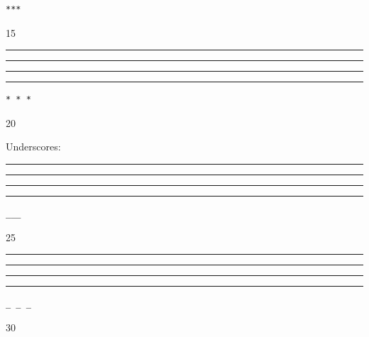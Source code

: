 \begin{verbatim}
***
\end{verbatim}

15

\begin{center}\rule{3in}{0.4pt}\end{center}

\begin{center}\rule{3in}{0.4pt}\end{center}

\begin{center}\rule{3in}{0.4pt}\end{center}

\begin{center}\rule{3in}{0.4pt}\end{center}

\begin{verbatim}
* * *
\end{verbatim}

20

Underscores:

\begin{center}\rule{3in}{0.4pt}\end{center}

\begin{center}\rule{3in}{0.4pt}\end{center}

\begin{center}\rule{3in}{0.4pt}\end{center}

\begin{center}\rule{3in}{0.4pt}\end{center}

\begin{verbatim}
___
\end{verbatim}

25

\begin{center}\rule{3in}{0.4pt}\end{center}

\begin{center}\rule{3in}{0.4pt}\end{center}

\begin{center}\rule{3in}{0.4pt}\end{center}

\begin{center}\rule{3in}{0.4pt}\end{center}

\begin{verbatim}
_ _ _
\end{verbatim}

30


